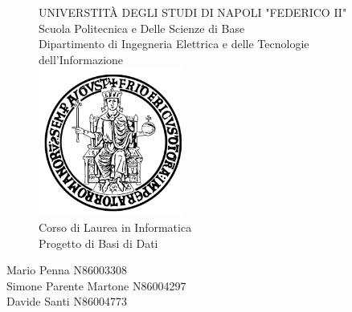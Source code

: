 \documentclass{report}
\begin{document}
\begin{sloppypar}
    \begin{figure}[htbp!]
        \begin{center}
            UNIVERSTIT\`A DEGLI STUDI DI NAPOLI "FEDERICO II" \\
            Scuola Politecnica e Delle Scienze di Base \\
            Dipartimento di Ingegneria Elettrica e delle Tecnologie dell'Informazione \\
            \includegraphics[width=.25\textwidth]{Immagini/FedericoII.png} \\
            Corso di Laurea in Informatica \\
            Progetto di Basi di Dati \\
        \end{center}
    \end{figure}

    \begin{center}
        Mario Penna N86003308 \\ Simone Parente Martone N86004297 \\ Davide Santi N86004773
    \end{center}
    
    \newpage
    
    \tableofcontents
    
    
    
    
    

\end{sloppypar}
\end{document}
